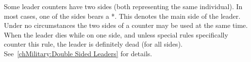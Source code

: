 Some leader counters have two sides (both
representing the same individual).
\bparag In most cases, one of the sides bears a *. This denotes the main side
of the leader.
\bparag Under no circumstances the two sides of a counter may be used at the
same time.
\bparag When the leader dies while on one side, and unless special rules
specifically counter this rule, the leader is definitely dead (for all sides).
\bparag See~\ref{chMilitary:Double Sided Leaders} for details.
\def\image(#1,#2)#3{\node (#3) at ($ (#1,#2) $)
  {\texttt{[image: counter\_7/\#3.png]}};}
\def\legendedouble#1#2#3{\node[outer sep=0pt,inner sep=0pt,text=black,text
  centered,text width=1.1in] (lastleg) at ($
  .5*(#1_recto)+.5*(#1_verso)+(0,#2) $){#3};}
\def\legendesimple#1#2#3{\node[outer sep=0pt,inner sep=0pt,text=black,text
  centered,text width=.8in] (lastleg) at ($ (#1)+(0,#2) $){#3};}
\def\legendelongue#1#2#3{\node[outer sep=0pt,inner sep=0pt,text=black,text
  centered,text width=1.15in] (lastleg) at ($ (#1)+(0,#2) $){#3};}
\def\pointe(#1,#2)#3{\draw[draw opacity=.5,very thick] (lastleg)--($ (#3) +
  (#1,#2) $);}
